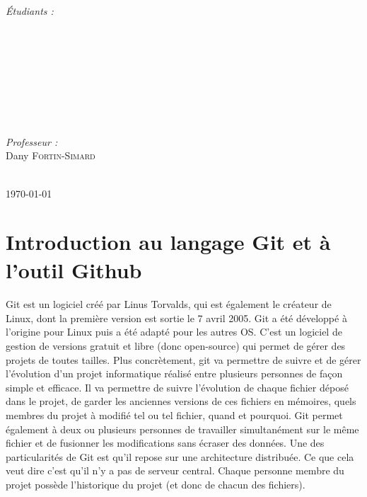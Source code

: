 \documentclass[11pt,canadien]{article}
\begin{document}
\begin{titlepage}
\begin{minipage}{0.4\textwidth}
\begin{flushleft} \large
\emph{Étudiants :}
\\ \antoine
\\ \estelle
\\ \joffrey
\\ \julien
\\ \karen
\\ \kevin
\\ \valentin
\end{flushleft}
\end{minipage}
~
\begin{minipage}{0.4\textwidth}
\begin{flushright} \large
\emph{Professeur :}\\
Dany \textsc{Fortin-Simard}
\end{flushright}
\end{minipage}\\[2cm]


{\large \today}\\[2cm]

\vfill %

\end{titlepage}

\newpage
\tableofcontents

\section{Introduction au langage Git et à l'outil Github}

\paragraph{} Git est un logiciel créé par Linus Torvalds, qui est également le créateur de Linux, dont la première version est sortie le 7 avril 2005. Git a été développé à l'origine pour Linux puis a été adapté pour les autres OS. C'est un logiciel de gestion de versions gratuit et libre (donc open-source) qui permet de gérer des projets de toutes tailles. Plus concrètement, git va permettre de suivre et de gérer l'évolution d'un projet informatique réalisé entre plusieurs personnes de façon simple et efficace. Il va permettre de suivre l'évolution de chaque fichier déposé dans le projet, de garder les anciennes versions de ces fichiers en mémoires, quels membres du projet à modifié tel ou tel fichier, quand et pourquoi. Git permet également à deux ou plusieurs personnes de travailler simultanément sur le même fichier et de fusionner les modifications sans écraser des données. Une des particularités de Git est qu'il repose sur une architecture distribuée. Ce que cela veut dire c'est qu'il n'y a pas de serveur central. Chaque personne membre du projet possède l'historique du projet (et donc de chacun des fichiers).
\end{document}
